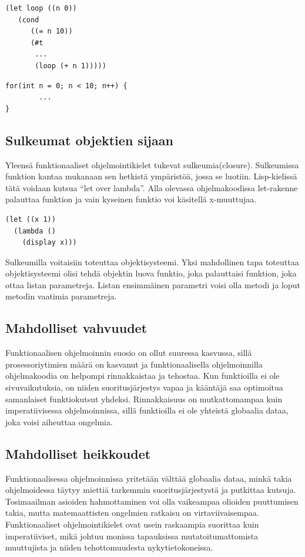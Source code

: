 \documentclass[12pt]{article}
\begin{document}
\begin{lstlisting}
(let loop ((n 0))
   (cond
      ((= n 10))
      (#t
       ...
       (loop (+ n 1)))))      
\end{lstlisting}
\begin{lstlisting}
for(int n = 0; n < 10; n++) {
        ...
}
\end{lstlisting}


\subsection{Sulkeumat objektien sijaan}
Yleensä funktionaaliset ohjelmointikielet tukevat sulkeumia(closure).
Sulkeumissa funktion kantaa mukanaan sen hetkistä ympäristöä, jossa se luotiin.
Lisp-kielissä tätä voidaan kutsua ``let over lambda''.
Alla olevassa ohjelmakoodissa let-rakenne palauttaa funktion ja vain kyseinen funktio voi käsitellä x-muuttujaa.
\begin{lstlisting}
(let ((x 1))
  (lambda ()
    (display x)))
\end{lstlisting}
Sulkeumilla voitaisiin toteuttaa objektisysteemi.
Yksi mahdollinen tapa toteuttaa objektisysteemi olisi tehdä objektin luova funktio, joka palauttaisi funktion, joka ottaa listan parametreja.
Listan ensimmäinen parametri voisi olla metodi ja loput metodin vaatimia parametreja.

\subsection{Mahdolliset vahvuudet}
Funktionaalisen ohjelmoinnin suosio on ollut suuressa kasvussa, sillä prosessoriytimien määrä on kasvanut ja funktionaalisella ohjelmoinnilla ohjelmakoodia on helpompi rinnakkaistaa ja tehostaa. Kun funktioilla ei ole sivuvaikutuksia, on niiden suoritusjärjestys vapaa ja kääntäjä saa optimoitua samanlaiset funktiokutsut yhdeksi. Rinnakkaisuus on mutkattomampaa kuin imperatiivisessa ohjelmoinnissa, sillä funktioilla ei ole yhteistä globaalia dataa, joka voisi aiheuttaa ongelmia.

\subsection{Mahdolliset heikkoudet}
Funktionaalisessa ohjelmoinnissa yritetään välttää globaalia dataa, minkä takia ohjelmoidessa täytyy miettiä tarkemmin suoritusjärjestystä ja putkittaa kutsuja. Tosimaailman asioiden hahmottaminen voi olla vaikeampaa olioiden puuttumisen takia, mutta matemaattisten ongelmien ratkaisu on virtaviivaisempaa. Funktionaaliset ohjelmointikielet ovat usein raskaampia suorittaa kuin imperatiiviset, mikä johtuu monissa tapauksissa mutatoitumattomista muuttujista ja niiden tehottomuudesta nykytietokoneissa.
\end{document}
